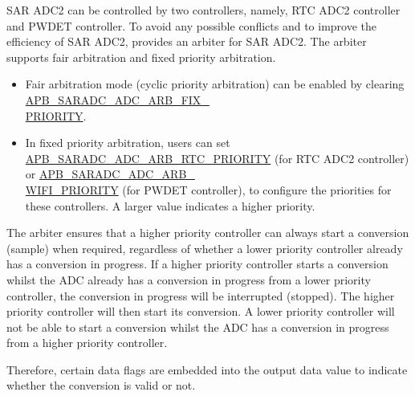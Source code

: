 \documentclass[main\_\_EN.tex]{subfiles}
\begin{document}
SAR ADC2 can be controlled by two controllers, namely, RTC ADC2 controller and PWDET controller. To avoid any possible conflicts and to improve the efficiency of SAR ADC2, \chipname{} provides an arbiter for SAR ADC2. The arbiter supports fair arbitration and fixed priority arbitration.

\begin{itemize}
    \item Fair arbitration mode (cyclic priority arbitration) can be enabled by clearing  \hyperref[fielddesc:APBSARADCADCARBFIXPRIORITY]{APB\_SARADC\_ADC\_ARB\_FIX\_\\PRIORITY}.
    \item In fixed priority arbitration, users can set \hyperref[fielddesc:APBSARADCADCARBRTCPRIORITY]{APB\_SARADC\_ADC\_ARB\_RTC\_PRIORITY} (for RTC ADC2 controller) or \hyperref[fielddesc:APBSARADCADCARBWIFIPRIORITY]{APB\_SARADC\_ADC\_ARB\_\\WIFI\_PRIORITY} (for PWDET controller), to configure the priorities for these controllers. A larger value indicates a higher priority.
\end{itemize}

The arbiter ensures that a higher priority controller can always start a conversion (sample) when required, regardless of whether a lower priority controller already has a conversion in progress. If a higher priority controller starts a conversion whilst the ADC already has a conversion in progress from a lower priority controller, the conversion in progress will be interrupted (stopped). The higher priority controller will then start its conversion. A lower priority controller will not be able to start a conversion whilst the ADC has a conversion in progress from a higher priority controller.

Therefore, certain data flags are embedded into the output data value to indicate whether the conversion is valid or not.
\end{document}
